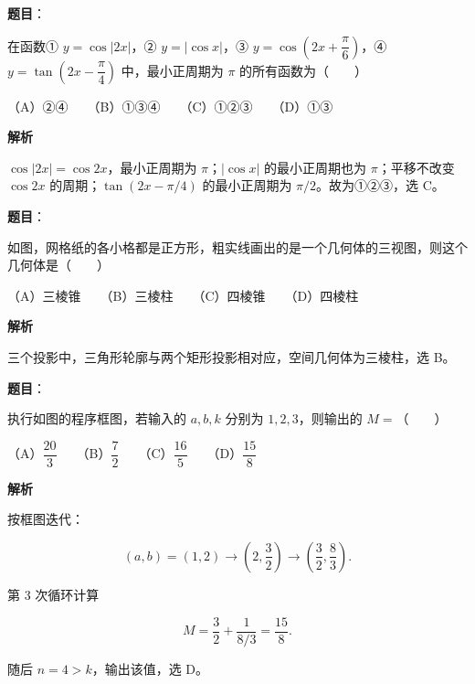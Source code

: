 \begin{answer}

\textbf{题目}：

在函数① $y=\cos|2x|$，② $y=|\cos x|$，③ $y=\cos\left(2x+\dfrac\pi6\right)$，④ $y=\tan\left(2x-\dfrac\pi4\right)$ 中，最小正周期为 $\pi$ 的所有函数为\mbox{（　　）}

（A）②④　　（B）①③④　　（C）①②③　　（D）①③

\textbf{解析}

$\cos|2x|=\cos2x$，最小正周期为 $\pi$；$|\cos x|$ 的最小正周期也为 $\pi$；平移不改变 $\cos2x$ 的周期；$\tan(2x-\pi/4)$ 的最小正周期为 $\pi/2$。故为①②③，选 C。


\end{answer}
\begin{answer}

\textbf{题目}：

如图，网格纸的各小格都是正方形，粗实线画出的是一个几何体的三视图，则这个几何体是\mbox{（　　）}
\nopagebreak[4]
\begin{center}\end{center}
\nopagebreak[4]
（A）三棱锥　　（B）三棱柱　　（C）四棱锥　　（D）四棱柱

\textbf{解析}

三个投影中，三角形轮廓与两个矩形投影相对应，空间几何体为三棱柱，选 B。


\end{answer}
\begin{answer}

\textbf{题目}：

执行如图的程序框图，若输入的 $a,b,k$ 分别为 $1,2,3$，则输出的 $M=$\mbox{（　　）}
\nopagebreak[4]
\begin{center}\end{center}
\nopagebreak[4]
（A）$\dfrac{20}{3}$　　（B）$\dfrac72$　　（C）$\dfrac{16}{5}$　　（D）$\dfrac{15}{8}$

\textbf{解析}

按框图迭代：

\nopagebreak[4]
\[
(a,b)=(1,2)\to\left(2,\frac32\right)\to\left(\frac32,\frac83\right).
\]

第 $3$ 次循环计算

\nopagebreak[4]
\[
M=\frac32+\frac1{8/3}=\frac{15}{8}.
\]

随后 $n=4>k$，输出该值，选 D。


\end{answer}
